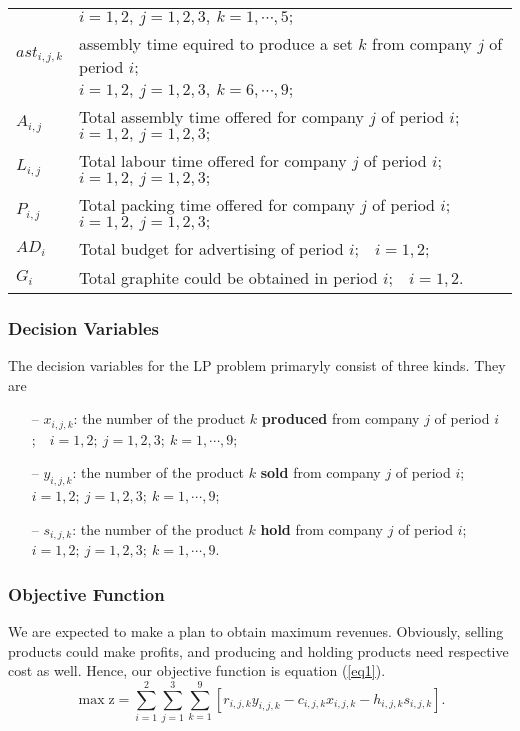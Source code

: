 \documentclass[12pt]{article}
\begin{document}
\begin{longtable}{ll}
			&$i=1,2,\ j=1,2,3,\ k=1,\cdots,5;$\\
			$ast_{i,j,k}$&assembly time equired to produce a set $k$ from company $j$ of period $i$;\\
			&$i=1,2,\ j=1,2,3,\ k=6,\cdots,9;$\\
			$A_{i,j}$& Total assembly time offered for company $j$ of period $i$;\ \ $i=1,2,\ j=1,2,3;$\\
			$L_{i,j}$&Total labour time offered for company $j$ of period $i$;\ \ $i=1,2,\ j=1,2,3;$\\
			$P_{i,j}$&Total packing time offered for company $j$ of period $i$;\ \ $i=1,2,\ j=1,2,3;$\\
			$AD_{i}$& Total budget for advertising of period $i$;\ \ $i=1,2;$\\
			$G_i$&Total graphite could be obtained in period $i$;\ \ $i=1,2.$\\
			\hline
			\hline
	\end{longtable}
	\subsubsection{Decision Variables}
	The decision variables for the LP problem primaryly consist of three kinds. They are

	\begin{itemize}
		\item[--] $x_{i,j,k}$: the number of the product $k$ \textbf{produced} from company $j$ of period $i$;\ \ $i=1,2;\ j=1,2,3;\ k=1,\cdots,9;$
		\item[--] $y_{i,j,k}$: the number of the product $k$ \textbf{sold} from company $j$ of period $i$;\ \ $i=1,2;\ j=1,2,3;\ k=1,\cdots,9$;
		\item[--] $s_{i,j,k}$: the number of the product $k$ \textbf{hold} from company $j$ of period $i$;\ \ $i=1,2;\ j=1,2,3;\ k=1,\cdots,9$.
	\end{itemize}
	\subsubsection{Objective Function}
	We are expected to make a plan to obtain maximum revenues. Obviously, selling  products could make profits, and producing and holding products need respective cost as well. Hence, our objective function is equation (\ref{eq1}).
	\begin{equation}
		\label{eq1}
		\max \mathrm{z}=\sum\limits_{i=1}^2\sum\limits_{j=1}^3\sum\limits_{k=1}^9[r_{i,j,k}y_{i,j,k}-c_{i,j,k}x_{i,j,k}-h_{i,j,k}s_{i,j,k}].
	\end{equation}
\end{document}
